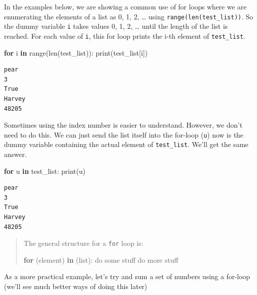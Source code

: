 \documentclass[
  letterpaper,
]{scrbook}
\newenvironment{Shaded}{\begin{snugshade}}{\end{snugshade}}
\newcommand{\BuiltInTok}[1]{#1}
\newcommand{\ControlFlowTok}[1]{\textcolor[rgb]{0.13,0.29,0.53}{\textbf{#1}}}
\newcommand{\KeywordTok}[1]{\textcolor[rgb]{0.13,0.29,0.53}{\textbf{#1}}}
\newcommand{\NormalTok}[1]{#1}
\begin{document}
In the examples below, we are showing a common use of for loops where we are enumerating the elements of a list as 0, 1, 2, \ldots{} using \texttt{range(len(test\_list))}. So the dummy variable \texttt{i} takes values 0, 1, 2, \ldots{} until the length of the list is reached. For each value of \texttt{i}, this for loop prints the i-th element of \texttt{test\_list}.

\begin{Shaded}
\begin{Highlighting}[]
\ControlFlowTok{for}\NormalTok{ i }\KeywordTok{in} \BuiltInTok{range}\NormalTok{(}\BuiltInTok{len}\NormalTok{(test_list)):}
    \BuiltInTok{print}\NormalTok{(test_list[i])}
\end{Highlighting}
\end{Shaded}

\begin{verbatim}
pear
3
True
Harvey
48205
\end{verbatim}

Sometimes using the index number is easier to understand. However, we don't need to do this. We can just send the list itself into the for-loop (\texttt{u}) now is the dummy variable containing the actual element of \texttt{test\_list}. We'll get the same answer.

\begin{Shaded}
\begin{Highlighting}[]
\ControlFlowTok{for}\NormalTok{ u }\KeywordTok{in}\NormalTok{ test_list:}
    \BuiltInTok{print}\NormalTok{(u)}
\end{Highlighting}
\end{Shaded}

\begin{verbatim}
pear
3
True
Harvey
48205
\end{verbatim}

\begin{quote}
The general structure for a \texttt{for} loop is:

\begin{Shaded}
\begin{Highlighting}[]
\ControlFlowTok{for}\NormalTok{ (element) }\KeywordTok{in}\NormalTok{ (}\BuiltInTok{list}\NormalTok{):}
\NormalTok{   	do some stuff}
\NormalTok{   	do more stuff}
\end{Highlighting}
\end{Shaded}
\end{quote}

As a more practical example, let's try and sum a set of numbers using a for-loop (we'll see much better ways of doing this later)
\end{document}
